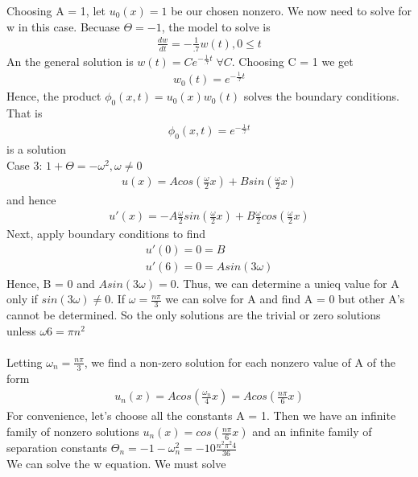 \documentclass[11pt]{SelfArxOneColBMN}
\begin{document}
\begin{exercise}
\begin{solution}
    Choosing A = 1, let $u_0(x) = 1$ be our chosen nonzero. We now need to solve for w in this case. Becuase $\Theta = -1$, the model to solve is\\
    \begin{eqnarray*}
      \frac{dw}{dt} = -\frac{1}{.7}w(t), 0 \leq t
   \end{eqnarray*}
   An the general solution is $w(t) = Ce^{-\frac{1}{.7}t} \; \forall C$. Choosing C = 1 we get 
   \begin{eqnarray*}
    w_0(t) = e^{-\frac{1}{.7}t}
   \end{eqnarray*}
   Hence, the product $\phi_0(x,t) = u_0(x)w_0(t)$ solves the boundary conditions. That is
   \begin{eqnarray*}
    \phi_0(x,t) = e^{-\frac{1}{.7}t}
   \end{eqnarray*}
   is a solution\\
   Case 3: $1 + \Theta = -\omega^2, \omega \neq 0$
   \begin{eqnarray*}
    u(x) = Acos(\frac{\omega}{2}x) +Bsin(\frac{\omega}{2}x)
   \end{eqnarray*}
   and hence
   \begin{eqnarray*}
    u'(x) = -A\frac{\omega}{2}sin(\frac{\omega}{2}x) +B\frac{\omega}{2}cos(\frac{\omega}{2}x)
   \end{eqnarray*}
   Next, apply boundary conditions to find
   \begin{eqnarray*}
    u'(0) = 0 = B\\
    u'(6) = 0 = Asin(3\omega)
   \end{eqnarray*}
   Hence, B = 0 and $Asin(3\omega) = 0$. Thus, we can determine a unieq value for A only if $sin(3\omega) \neq 0$. If $\omega = \frac{n\pi}{3}$ we can solve for A and find A = 0 but other A's cannot be determined. So the only solutions are the trivial or zero solutions unless $\omega 6 = \pi n^2$\\
   \\
   Letting $\omega_n = \frac{n\pi}{3}$, we find a non-zero solution for each nonzero value of A of the form
   \begin{eqnarray*}
    u_n(x) = Acos(\frac{\omega_n}{4}x) = Acos(\frac{n\pi}{6}x)
   \end{eqnarray*}
   For convenience, let's choose all the constants A = 1. Then we have an infinite family of nonzero solutions $u_n(x) = cos(\frac{n\pi}{6}x)$ and an infinite family of separation constants $\Theta_n = -1 - \omega^2_n = -1 0 \frac{n^2\pi^2 4}{36}$\\
   We can solve the w equation. We must solve

\end{solution}
\end{exercise}
\end{document}

